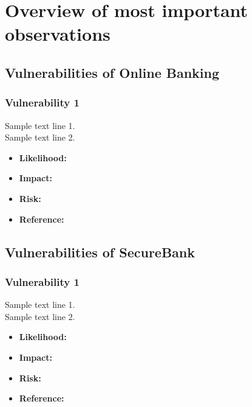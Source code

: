 \chapter{Overview of most important observations}

\section{Vulnerabilities of Online Banking}

\subsection{Vulnerability 1}
Sample text line 1.\\
Sample text line 2.\\
\begin{itemize}
	\item \textbf{Likelihood:}
	\item \textbf{Impact:}
	\item \textbf{Risk:}
	\item \textbf{Reference:}
\end{itemize}

\section{Vulnerabilities of SecureBank}

\subsection{Vulnerability 1}
Sample text line 1.\\
Sample text line 2.\\
\begin{itemize}
	\item \textbf{Likelihood:}
	\item \textbf{Impact:}
	\item \textbf{Risk:}
	\item \textbf{Reference:}
\end{itemize}